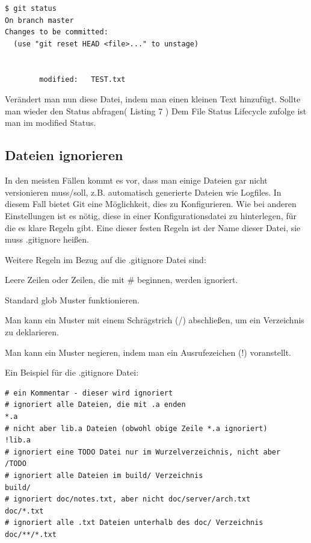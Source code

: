 \documentclass[12pt,a4paper,bibliography=totocnumbered,listof=totocnumbered]{scrartcl}
\begin{document}
\vspace{1em}
\begin{lstlisting}[caption=Git Statusbefehl nachdem verändern einer Datei, label=lst:arduino]
$ git status
On branch master
Changes to be committed:
  (use "git reset HEAD <file>..." to unstage)

      
        modified:   TEST.txt

\end{lstlisting}
Verändert man nun diese Datei, indem man einen kleinen Text hinzufügt. Sollte man wieder den Status abfragen( Listing 7 )
Dem File Status Lifecycle zufolge ist man im modified Status. 

\subsection{ Dateien ignorieren}
In den meisten Fällen kommt es vor, dass man einige Dateien gar nicht versionieren muss/soll, z.B. automatisch generierte Dateien wie Logfiles. In diesem Fall bietet Git eine Möglichkeit, dies zu Konfigurieren. Wie bei anderen Einstellungen ist es nötig, diese in einer Konfigurationsdatei zu hinterlegen, für die es klare Regeln gibt. Eine dieser festen Regeln ist der Name dieser Datei, sie muss .gitignore heißen.

Weitere Regeln im Bezug auf die .gitignore Datei sind:

\begin{compactitem}
	\item Leere Zeilen oder Zeilen, die mit # beginnen, werden 			     ignoriert.
	\item Standard glob Muster funktionieren.
	\item Man kann ein Muster mit einem Schrägstrich (/) abschließen, um ein Verzeichnis zu deklarieren.
	\item  Man kann ein Muster negieren, indem man ein Ausrufezeichen (!) voranstellt.
\end{compactitem}

Ein Beispiel für die .gitignore Datei:
\vspace{1em}
\begin{lstlisting}[caption=Git Einstellungen der.gitignore Datei, label=lst:arduino]
# ein Kommentar - dieser wird ignoriert
# ignoriert alle Dateien, die mit .a enden
*.a
# nicht aber lib.a Dateien (obwohl obige Zeile *.a ignoriert)
!lib.a
# ignoriert eine TODO Datei nur im Wurzelverzeichnis, nicht aber
/TODO
# ignoriert alle Dateien im build/ Verzeichnis
build/
# ignoriert doc/notes.txt, aber nicht doc/server/arch.txt
doc/*.txt
# ignoriert alle .txt Dateien unterhalb des doc/ Verzeichnis
doc/**/*.txt
\end{lstlisting}
\end{document}

